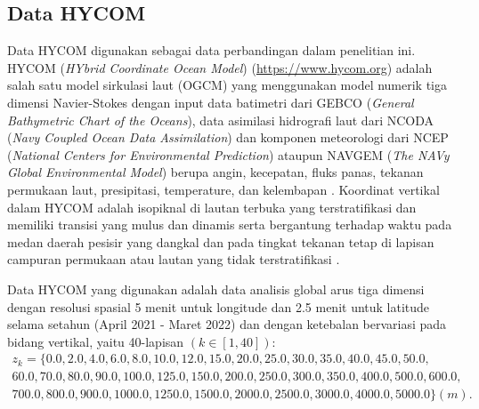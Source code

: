 \begin{spacing}{1.5}
\subsection[Data HYCOM]{Data HYCOM}
	Data HYCOM digunakan sebagai data perbandingan dalam penelitian ini. HYCOM (\textit{HYbrid Coordinate Ocean Model}) (\href{https://www.hycom.org}{https://www.hycom.org}) adalah salah satu model sirkulasi laut (OGCM) yang menggunakan model numerik tiga dimensi Navier-Stokes dengan input data batimetri dari GEBCO (\textit{General Bathymetric Chart of the Oceans}), data asimilasi hidrografi laut dari NCODA (\textit{Navy Coupled Ocean Data Assimilation}) dan komponen meteorologi dari NCEP (\textit{National Centers for Environmental Prediction}) ataupun NAVGEM (\textit{The NAVy Global Environmental Model}) berupa angin, kecepatan, fluks panas, tekanan permukaan laut, presipitasi, temperature, dan kelembapan . Koordinat vertikal dalam HYCOM adalah isopiknal di lautan terbuka yang terstratifikasi dan memiliki transisi yang mulus dan dinamis serta bergantung terhadap waktu pada medan daerah pesisir yang dangkal dan pada tingkat tekanan tetap di lapisan campuran permukaan atau lautan yang tidak terstratifikasi . 
	\par Data HYCOM yang digunakan adalah data analisis global arus tiga dimensi dengan resolusi spasial 5 menit untuk longitude dan 2.5 menit untuk latitude selama setahun (April 2021 - Maret 2022) dan dengan ketebalan bervariasi pada bidang vertikal, yaitu 40-lapisan $(k \in [1,40])$:
	\begin{equation*}
		\begin{aligned}
			z_k = \{0.0, 2.0, 4.0, 6.0, 8.0, 10.0, 12.0, 15.0, 20.0, 25.0, 30.0, 35.0, 40.0, 45.0, 50.0, \\
			60.0, 70.0,	80.0, 90.0, 100.0, 125.0, 150.0, 200.0, 250.0, 300.0, 350.0, 400.0, 500.0, 600.0,\\
			700.0, 800.0, 900.0, 1000.0, 1250.0, 1500.0, 2000.0, 2500.0, 3000.0, 4000.0, 5000.0\} (m). \\
		\end{aligned}
	\end{equation*}
\end{spacing}
\vspace{-1.5pc}
